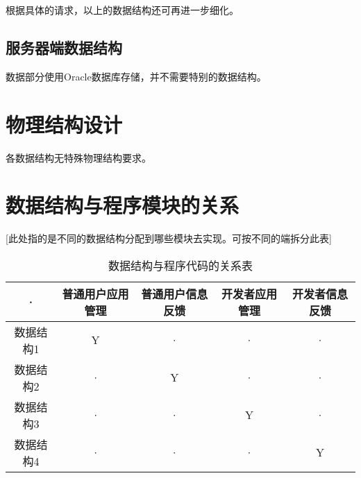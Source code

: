 根据具体的请求，以上的数据结构还可再进一步细化。

\subsection{服务器端数据结构}
数据部分使用Oracle数据库存储，并不需要特别的数据结构。

\section{物理结构设计}
各数据结构无特殊物理结构要求。

\section{数据结构与程序模块的关系}
[此处指的是不同的数据结构分配到哪些模块去实现。可按不同的端拆分此表]
\begin{table}[htbp]
\centering
\caption{数据结构与程序代码的关系表} \label{tab:datastructure-module}
\begin{tabular}{|c|c|c|c|c|}
    \hline
    · & 普通用户应用管理 & 普通用户信息反馈 & 开发者应用管理 & 开发者信息反馈\\
    \hline
    数据结构1 & Y & · & · & ·\\
    \hline
    数据结构2 & · & Y & · & ·\\
    \hline
    数据结构3 & · & · & Y & ·\\
    \hline
    数据结构4 & · & · & · & Y\\
    \hline
\end{tabular}
\end{table}